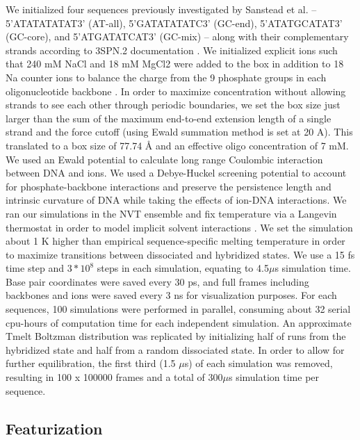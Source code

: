 \documentclass[journal=jpcbfk,manuscript=article]{achemso}
\begin{document}
We initialized four sequences previously investigated by Sanstead et al. -- 5'ATATATATAT3' (AT-all), 5'GATATATATC3' (GC-end), 5'ATATGCATAT3' (GC-core), and 5'ATGATATCAT3' (GC-mix) -- along with their complementary strands according to 3SPN.2 documentation \citep{Sanstead2016, Phys2014}. We initialized explicit ions such that 240 mM NaCl and 18 mM MgCl2 were added to the box in addition to 18 Na counter ions to balance the charge from the 9 phosphate groups in each oligonucleotide backbone \citep{Hinckley2015}. In order to maximize concentration without allowing strands to see each other through periodic boundaries, we set the box size just larger than the sum of the maximum end-to-end extension length of a single strand and the force cutoff (using Ewald summation method is set at 20 A). This translated to a box size of 77.74 Å and an effective oligo concentration of 7 mM. We used an Ewald potential to calculate long range Coulombic interaction between DNA and ions. We used a Debye-Huckel screening potential to account for phosphate-backbone interactions and preserve the persistence length and intrinsic curvature of DNA while taking the effects of ion-DNA interactions\citep{Hinckley2015}. We ran our simulations in the NVT ensemble and fix temperature via a Langevin thermostat in order to model implicit solvent interactions \citep{Schneider1978Molecular-dynamicsTransitions}. We set the simulation about 1 K higher than empirical sequence-specific melting temperature in order to maximize transitions between dissociated and hybridized states. We use a 15 fs time step and $3*10^{8}$ steps in each simulation, equating to 4.5$\mu$s simulation time. Base pair coordinates were saved every 30 ps, and full frames including backbones and ions were saved every 3 ns for visualization purposes. For each sequences, 100 simulations were performed in parallel, consuming about 32 serial cpu-hours of computation time for each independent simulation. An approximate Tmelt Boltzman distribution was replicated by initializing half of runs from the hybridized state and half from a random dissociated state. In order to allow for further equilibration, the first third (1.5 $\mu$s) of each simulation was removed, resulting in 100 x 100000 frames and a total of 300$\mu$s simulation time per sequence.

\subsection{\label{sec:methods}Featurization}
\end{document}
